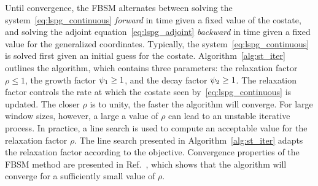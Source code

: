 Until convergence, the FBSM alternates between solving the
system~\eqref{eq:lspg_continuous} \textit{forward} in time given a fixed value
of the costate, and solving the adjoint equation~\eqref{eq:lspg_adjoint}
\textit{backward} in time given a fixed value for the generalized coordinates.
Typically, the system~\eqref{eq:lspg_continuous} is solved first given an
initial guess for the costate.
%
Algorithm~\ref{alg:st_iter} outlines the algorithm, which 
contains three parameters: the relaxation factor $\rho \le 1$, the growth factor
$\psi_1 \ge 1$, and the decay factor $\psi_2 \ge 1$. The relaxation factor controls the rate at which the costate seen by~\eqref{eq:lspg_continuous} is updated. The
closer $\rho$ is to unity, the faster the algorithm will converge.
For large window sizes, however, a large a value of $\rho$ can lead to an unstable iterative process. 
In practice, a line search is used to compute an acceptable value for the
relaxation factor $\rho$. The line search presented in Algorithm~\ref{alg:st_iter} adapts the relaxation factor
according to the objective. Convergence properties of the FBSM method are
presented in Ref.~\cite{McAsey2012ConvergenceOT}, which shows that the
algorithm will converge for a sufficiently small 
value of $\rho$.


